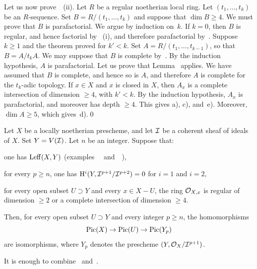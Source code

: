 Let us now prove~~(ii). Let $R$ be a regular noetherian local ring. Let $(t_1, \ldots, t_k)$ be an $R$-sequence. Set $B=R/(t_1, \ldots, t_k)$ and suppose that $\dim B\geq 4$. We must prove that $B$ is parafactorial. We argue by induction on~$k$. If $k=0$, then $B$ is regular, and hence factorial by ~(i), and therefore parafactorial by~. Suppose $k\geq 1$ and the theorem proved for $k'<k$. Set $A=R/(t_1, \ldots, t_{k-1})$, so that $B=A/t_k A$. We may suppose that $B$ is complete by~. By the induction hypothesis, $A$ is parafactorial. Let us prove that Lemma~ applies. We have assumed that $B$ is complete, and hence so is $A$, and therefore $A$ is complete for the $t_k$-adic topology. If $x\in X$ and $x$ is closed in $X$, then $A_x$ is a complete intersection of dimension $\geq 4$, with $k'<k$. By the induction hypothesis, $A_x$ is parafactorial, and moreover has depth $\geq 4$. This gives a), c), and~e). Moreover, $\dim A\geq 5$, which gives~d).\qed

\begin{theoreme} \label{XI.3.18}
Let $X$ be a locally noetherian prescheme, and let $\mathcal I$ be a coherent sheaf of ideals of $X$. Set $Y=V(\mathcal I)$. Let $n$ be an integer. Suppose that:
\begin{enumeratei}
\item
one has $\operatorname{Leff}(X, Y)$ (\cf examples ~~and~~),
\item
for every $p\geq n$, one has $\mathrm H^i(Y, \mathcal I^{p+1}/\mathcal I^{p+2})=0$ for $i=1$ and $i=2$,
\item
for every open subset $U\supset Y$ and every $x\in X-U$, the ring $\mathcal O_{X,x}$ is regular of dimension $\geq 2$ or a complete intersection of dimension $\geq 4$.
\end{enumeratei}
\noindent
Then, for every open subset $U\supset Y$ and every integer $p\geq n$, the homomorphisms
\[
\operatorname{Pic}(X)\to\operatorname{Pic}(U)\to\operatorname{Pic}(Y_p)
\]
are isomorphisms, where $Y_p$ denotes the prescheme $(Y, \mathcal O_X/\mathcal I^{p+1})$.
\end{theoreme}

It is enough to combine ~and~.
